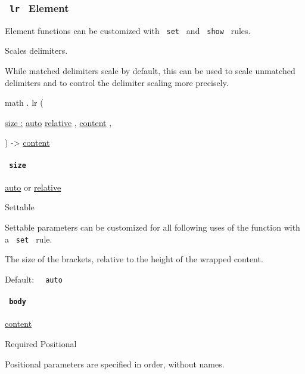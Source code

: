 \subsubsection{\texorpdfstring{\texttt{\ lr\ } {{ Element
}}}{ lr   Element }}\label{functions-lr}

\label{functions-lr-element-tooltip}
Element functions can be customized with \texttt{\ set\ } and
\texttt{\ show\ } rules.

Scales delimiters.

While matched delimiters scale by default, this can be used to scale
unmatched delimiters and to control the delimiter scaling more
precisely.

math { . } { lr } (

{ \hyperref[functions-lr-parameters-size]{size :}
\href{/docs/reference/foundations/auto/}{auto}
\href{/docs/reference/layout/relative/}{relative} , } {
\href{/docs/reference/foundations/content/}{content} , }

) -\textgreater{} \href{/docs/reference/foundations/content/}{content}

\paragraph{\texorpdfstring{\texttt{\ size\ }}{ size }}\label{functions-lr-size}

\href{/docs/reference/foundations/auto/}{auto} {or}
\href{/docs/reference/layout/relative/}{relative}

{{ Settable }}

\label{functions-lr-size-settable-tooltip}
Settable parameters can be customized for all following uses of the
function with a \texttt{\ set\ } rule.

The size of the brackets, relative to the height of the wrapped content.

Default: \texttt{\ }{\texttt{\ auto\ }}\texttt{\ }

\paragraph{\texorpdfstring{\texttt{\ body\ }}{ body }}\label{functions-lr-body}

\href{/docs/reference/foundations/content/}{content}

{Required} {{ Positional }}

\label{functions-lr-body-positional-tooltip}
Positional parameters are specified in order, without names.

